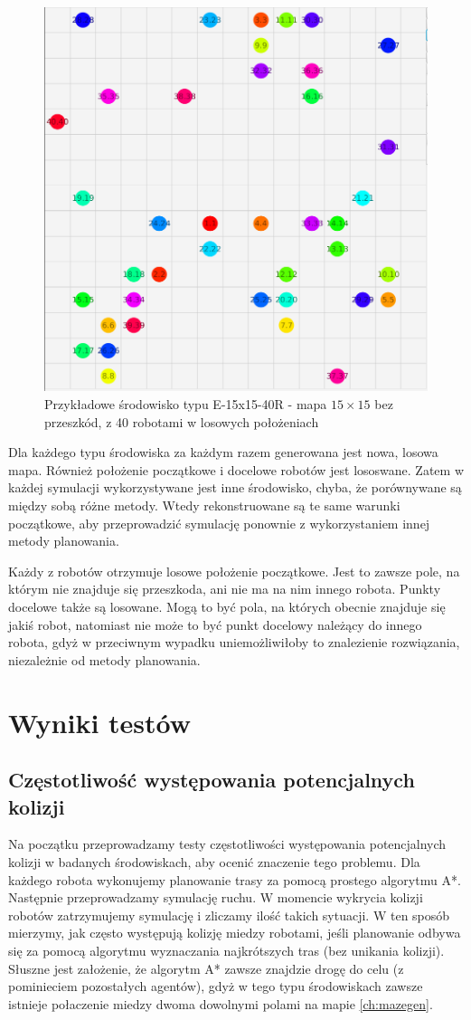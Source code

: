 \begin{figure}
	\centering
	\includegraphics[width=0.6\columnwidth]{img/robopath/tests-15-15-empty-40}
	\caption{Przykładowe środowisko typu E-15x15-40R - mapa $15 \times 15$ bez przeszkód, z 40 robotami w losowych położeniach}
	\label{fig:test-env-15-15-empty-40}
\end{figure}

Dla każdego typu środowiska za każdym razem generowana jest nowa, losowa mapa. Również położenie początkowe i docelowe robotów jest lososwane. Zatem w każdej symulacji wykorzystywane jest inne środowisko, chyba, że porównywane są między sobą różne metody. Wtedy rekonstruowane są te same warunki początkowe, aby przeprowadzić symulację ponownie z wykorzystaniem innej metody planowania.

Każdy z robotów otrzymuje losowe położenie początkowe. Jest to zawsze pole, na którym nie znajduje się przeszkoda, ani nie ma na nim innego robota.
Punkty docelowe także są losowane. Mogą to być pola, na których obecnie znajduje się jakiś robot, natomiast nie może to być punkt docelowy należący do innego robota, gdyż w przeciwnym wypadku uniemożliwiłoby to znalezienie rozwiązania, niezależnie od metody planowania.

\section{Wyniki testów}
\subsection{Częstotliwość występowania potencjalnych kolizji} %
Na początku przeprowadzamy testy częstotliwości występowania potencjalnych kolizji w badanych środowiskach, aby ocenić znaczenie tego problemu.
Dla każdego robota wykonujemy planowanie trasy za pomocą prostego algorytmu A*. Następnie przeprowadzamy symulację ruchu. W momencie wykrycia kolizji robotów zatrzymujemy symulację i zliczamy ilość takich sytuacji. W ten sposób mierzymy, jak często występują kolizję miedzy robotami, jeśli planowanie odbywa się za pomocą algorytmu wyznaczania najkrótszych tras (bez unikania kolizji).
Słuszne jest założenie, że algorytm A* zawsze znajdzie drogę do celu (z pominieciem pozostałych agentów), gdyż w tego typu środowiskach zawsze istnieje połaczenie miedzy dwoma dowolnymi polami na mapie \ref{ch:mazegen}.

